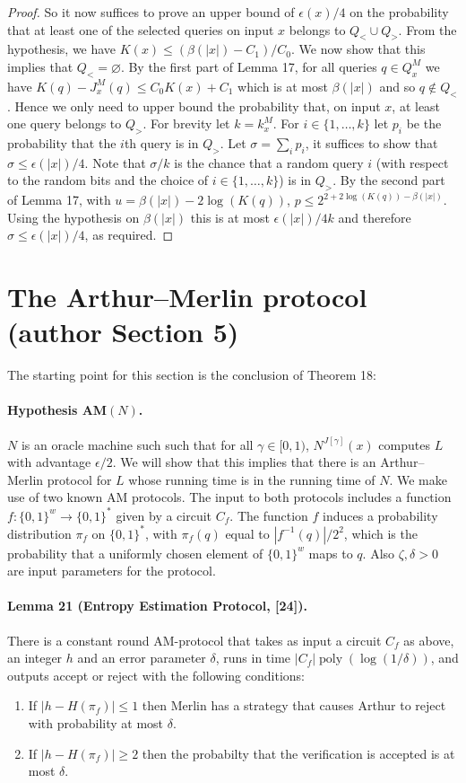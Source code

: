 \documentclass[10pt,a4paper]{article}
\begin{document}
\begin{proof}
So it now suffices to prove an upper bound of $\epsilon(x)/4$ on the probability that at least one of the selected queries on input $x$ belongs to $Q_<\cup Q_>$.
From the hypothesis, we have $K(x)\leq(\beta(|x|)-C_1)/C_0$. We now show that this implies that $Q_<=\varnothing$. By the first part of Lemma 17, for all queries $q\in Q_x^M$ we have $K(q)-J_x^M(q)\leq C_0K(x)+C_1$ which is at most $\beta(|x|)$ and so $q\notin Q_<$.
Hence we only need to upper bound the probability that, on input $x$, at least one query belongs to $Q_>$. For brevity let $k=k_x^M$. For $i\in\{1,\ldots,k\}$ let $p_i$ be the probability that the $i$th query is in $Q_>$. Let $\sigma=\sum_ip_i$, it suffices to show that $\sigma\leq\epsilon(|x|)/4$. Note that $\sigma/k$ is the chance that a random query $i$ (with respect to the random bits and the choice of $i\in\{1,\ldots,k\}$) is in $Q_>$. By the second part of Lemma 17, with $u=\beta(|x|)-2\log(K(q))$, $p\leq2^{2+2\log(K(q))-\beta(|x|)}$. Using the hypothesis on $\beta(|x|)$ this is at most $\epsilon(|x|)/4k$ and therefore $\sigma\leq\epsilon(|x|)/4$, as required.
\end{proof}

\section*{The Arthur--Merlin protocol (author Section 5)}
The starting point for this section is the conclusion of Theorem 18:
\paragraph{Hypothesis AM$(N)$.} $N$ is an oracle machine such such that for all $\gamma\in[0,1)$, $N^{J[\gamma]}(x)$ computes $L$ with advantage $\epsilon/2$.
We will show that this implies that there is an Arthur--Merlin protocol for $L$ whose running time is in the running time of $N$.
We make use of two known AM protocols. The input to both protocols includes a function $f:\{0,1\}^w\longrightarrow\{0,1\}^*$ given by a circuit $C_f$. The function $f$ induces a probability distribution $\pi_f$ on $\{0,1\}^*$, with $\pi_f(q)$ equal to $|f^{-1}(q)|/2^2$, which is the probability that a uniformly chosen element of $\{0,1\}^w$ maps to $q$. Also $\zeta,\delta>0$ are input parameters for the protocol.
\paragraph{Lemma 21 (Entropy Estimation Protocol, [24]).} There is a constant round AM-protocol that takes as input a circuit $C_f$ as above, an integer $h$ and an error parameter $\delta$, runs in time $|C_f|\operatorname{poly}(\log(1/\delta))$, and outputs accept or reject with the following conditions:
\begin{enumerate}\item If $|h-H(\pi_f)|\le1$ then Merlin has a strategy that causes Arthur to reject with probability at most $\delta$.
\item If $|h-H(\pi_f)|\ge2$ then the probabilty that the verification is accepted is at most $\delta$.\end{enumerate}
\end{document}
